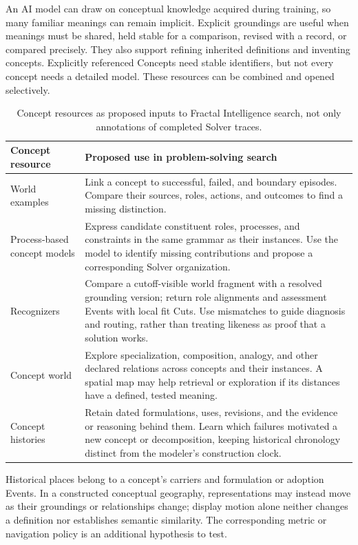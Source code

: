 \documentclass[10pt]{article}
\begin{document}
An AI model can draw on conceptual knowledge acquired during training, so
many familiar meanings can remain implicit. Explicit groundings are useful
when meanings must be shared, held stable for a comparison, revised with a
record, or compared precisely. They also support refining inherited definitions
and inventing concepts. Explicitly referenced Concepts need stable identifiers,
but not every concept needs a detailed model. These resources can be combined
and opened selectively.

\begin{table}[!htbp]
\centering
\small
\begin{tabularx}{\textwidth}{@{}p{}Y@{}}
\toprule
Concept resource & Proposed use in problem-solving search \\
\midrule
World examples & Link a concept to successful, failed, and boundary episodes.
Compare their sources, roles, actions, and outcomes to find a missing distinction. \\
Process-based concept models & Express candidate constituent roles, processes, and
constraints in the same grammar as their instances. Use the model to identify
missing contributions and propose a corresponding Solver organization. \\
Recognizers & Compare a cutoff-visible world fragment with a resolved grounding
version; return role alignments and assessment Events with local fit Cuts.
Use mismatches to guide diagnosis and routing, rather than treating likeness
as proof that a solution works. \\
Concept world & Explore specialization, composition, analogy, and
other declared relations across concepts and their instances. A spatial map
may help retrieval or exploration if its distances have a defined, tested meaning. \\
Concept histories & Retain dated formulations, uses, revisions, and the evidence
or reasoning behind them. Learn which failures motivated a new concept or
decomposition, keeping historical chronology distinct from the modeler's
construction clock. \\
\bottomrule
\end{tabularx}
\caption{Concept resources as proposed inputs to Fractal Intelligence search,
not only annotations of completed Solver traces.}
\label{tab:concept-search-resources}
\end{table}

Historical places belong to a concept's carriers and formulation or adoption
Events. In a constructed conceptual geography, representations may instead
move as their groundings or relationships change; display motion alone neither
changes a definition nor establishes semantic similarity. The corresponding
metric or navigation policy is an additional hypothesis to test.
\end{document}
